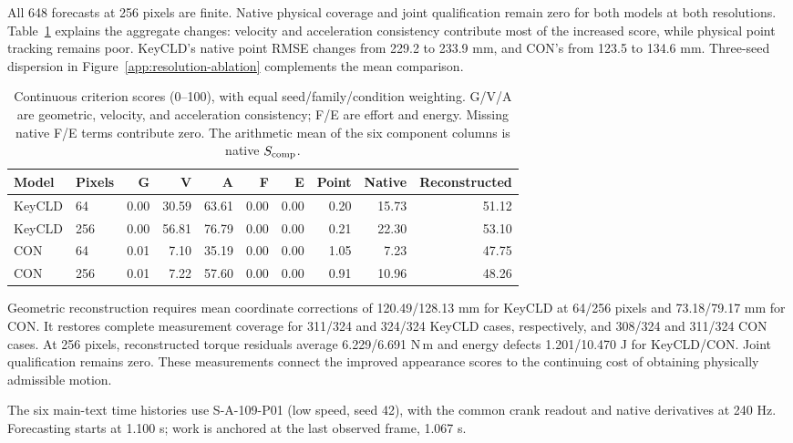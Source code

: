 All 648 forecasts at 256 pixels are finite. Native physical coverage and joint qualification remain zero for both models at both resolutions. Table~\ref{app:resolution-components} explains the aggregate changes: velocity and acceleration consistency contribute most of the increased score, while physical point tracking remains poor. KeyCLD's native point RMSE changes from 229.2 to 233.9 mm, and CON's from 123.5 to 134.6 mm. Three-seed dispersion in Figure~\ref{app:resolution-ablation} complements the mean comparison.

\begin{table}[t]
\caption{Continuous criterion scores (0--100), with equal seed/family/condition weighting. G/V/A are geometric, velocity, and acceleration consistency; F/E are effort and energy. Missing native F/E terms contribute zero. The arithmetic mean of the six component columns is native $S_{\rm comp}$.}
\label{app:resolution-components}
\centering\small
\begin{tabular}{llrrrrrrrr}
\toprule
Model & Pixels & G & V & A & F & E & Point & Native & Reconstructed\\
\midrule
KeyCLD & 64 & 0.00 & 30.59 & 63.61 & 0.00 & 0.00 & 0.20 & 15.73 & 51.12 \\
KeyCLD & 256 & 0.00 & 56.81 & 76.79 & 0.00 & 0.00 & 0.21 & 22.30 & 53.10 \\
CON & 64 & 0.01 & 7.10 & 35.19 & 0.00 & 0.00 & 1.05 & 7.23 & 47.75 \\
CON & 256 & 0.01 & 7.22 & 57.60 & 0.00 & 0.00 & 0.91 & 10.96 & 48.26 \\
\bottomrule
\end{tabular}
\end{table}

Geometric reconstruction requires mean coordinate corrections of 120.49/128.13 mm for KeyCLD at 64/256 pixels and 73.18/79.17 mm for CON. It restores complete measurement coverage for 311/324 and 324/324 KeyCLD cases, respectively, and 308/324 and 311/324 CON cases. At 256 pixels, reconstructed torque residuals average 6.229/6.691 N\,m and energy defects 1.201/10.470 J for KeyCLD/CON. Joint qualification remains zero. These measurements connect the improved appearance scores to the continuing cost of obtaining physically admissible motion.

The six main-text time histories use S-A-109-P01 (low speed, seed 42), with the common crank readout and native derivatives at 240 Hz. Forecasting starts at 1.100 s; work is anchored at the last observed frame, 1.067 s.

